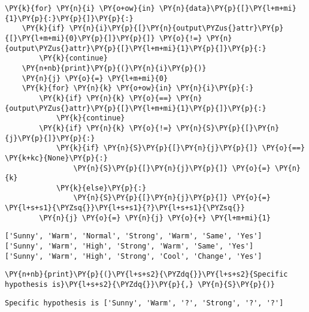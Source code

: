     \begin{tcolorbox}[breakable, size=fbox, boxrule=1pt, pad at break*=1mm,colback=cellbackground, colframe=cellborder]
\begin{Verbatim}[commandchars=\\\{\}]
\PY{k}{for} \PY{n}{i} \PY{o+ow}{in} \PY{n}{data}\PY{p}{[}\PY{l+m+mi}{1}\PY{p}{:}\PY{p}{]}\PY{p}{:}
    \PY{k}{if} \PY{n}{i}\PY{p}{[}\PY{n}{output\PYZus{}attr}\PY{p}{[}\PY{l+m+mi}{0}\PY{p}{]}\PY{p}{]} \PY{o}{!=} \PY{n}{output\PYZus{}attr}\PY{p}{[}\PY{l+m+mi}{1}\PY{p}{]}\PY{p}{:}
        \PY{k}{continue}
    \PY{n+nb}{print}\PY{p}{(}\PY{n}{i}\PY{p}{)}
    \PY{n}{j} \PY{o}{=} \PY{l+m+mi}{0}
    \PY{k}{for} \PY{n}{k} \PY{o+ow}{in} \PY{n}{i}\PY{p}{:}
        \PY{k}{if} \PY{n}{k} \PY{o}{==} \PY{n}{output\PYZus{}attr}\PY{p}{[}\PY{l+m+mi}{1}\PY{p}{]}\PY{p}{:}
            \PY{k}{continue}
        \PY{k}{if} \PY{n}{k} \PY{o}{!=} \PY{n}{S}\PY{p}{[}\PY{n}{j}\PY{p}{]}\PY{p}{:}
            \PY{k}{if} \PY{n}{S}\PY{p}{[}\PY{n}{j}\PY{p}{]} \PY{o}{==} \PY{k+kc}{None}\PY{p}{:}
                \PY{n}{S}\PY{p}{[}\PY{n}{j}\PY{p}{]} \PY{o}{=} \PY{n}{k}
            \PY{k}{else}\PY{p}{:}
                \PY{n}{S}\PY{p}{[}\PY{n}{j}\PY{p}{]} \PY{o}{=} \PY{l+s+s1}{\PYZsq{}}\PY{l+s+s1}{?}\PY{l+s+s1}{\PYZsq{}}
        \PY{n}{j} \PY{o}{=} \PY{n}{j} \PY{o}{+} \PY{l+m+mi}{1}
\end{Verbatim}
\end{tcolorbox}

    \begin{Verbatim}[commandchars=\\\{\}]
['Sunny', 'Warm', 'Normal', 'Strong', 'Warm', 'Same', 'Yes']
['Sunny', 'Warm', 'High', 'Strong', 'Warm', 'Same', 'Yes']
['Sunny', 'Warm', 'High', 'Strong', 'Cool', 'Change', 'Yes']
    \end{Verbatim}

    \begin{tcolorbox}[breakable, size=fbox, boxrule=1pt, pad at break*=1mm,colback=cellbackground, colframe=cellborder]
\begin{Verbatim}[commandchars=\\\{\}]
\PY{n+nb}{print}\PY{p}{(}\PY{l+s+s2}{\PYZdq{}}\PY{l+s+s2}{Specific hypothesis is}\PY{l+s+s2}{\PYZdq{}}\PY{p}{,} \PY{n}{S}\PY{p}{)}
\end{Verbatim}
\end{tcolorbox}

    \begin{Verbatim}[commandchars=\\\{\}]
Specific hypothesis is ['Sunny', 'Warm', '?', 'Strong', '?', '?']
    \end{Verbatim}